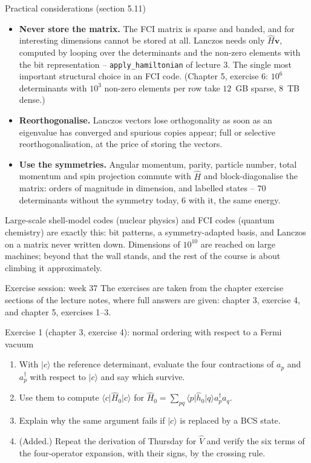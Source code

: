 \documentclass[aspectratio=169,10pt]{beamer}
\newcommand{\mbbox}[1]{%
  \begin{tcolorbox}[colback=paleblue,colframe=uioblue,title={\bfseries Many-body connection}]
  #1
  \end{tcolorbox}}
\newcommand{\ket}[1]{\vert #1\rangle}
\newcommand{\bra}[1]{\langle #1\vert}
\newcommand{\element}[3]{\langle #1\vert #2\vert #3\rangle}
\begin{document}
\begin{frame}{Practical considerations (section 5.11)}
  \small
  \begin{itemize}
    \item \textbf{Never store the matrix.} The FCI matrix is sparse and banded, and for interesting dimensions cannot be stored at all. Lanczos needs only $\hat{H}\bm{v}$, computed by looping over the determinants and the non-zero elements with the bit representation -- \texttt{apply\_hamiltonian} of lecture 3. The single most important structural choice in an FCI code. (Chapter 5, exercise 6: $10^6$ determinants with $10^3$ non-zero elements per row take $12$~GB sparse, $8$~TB dense.)
    \item \textbf{Reorthogonalise.} Lanczos vectors lose orthogonality as soon as an eigenvalue has converged and spurious copies appear; full or selective reorthogonalisation, at the price of storing the vectors.
    \item \textbf{Use the symmetries.} Angular momentum, parity, particle number, total momentum and spin projection commute with $\hat{H}$ and block-diagonalise the matrix: orders of magnitude in dimension, and labelled states -- $70$ determinants without the symmetry today, $6$ with it, the same energy.
  \end{itemize}
  \mbbox{\small Large-scale shell-model codes (nuclear physics) and FCI codes (quantum chemistry) are exactly this: bit patterns, a symmetry-adapted basis, and Lanczos on a matrix never written down. Dimensions of $10^{10}$ are reached on large machines; beyond that the wall stands, and the rest of the course is about climbing it approximately.}
\end{frame}

\begin{frame}{Exercise session: week 37}
  \footnotesize
  The exercises are taken from the chapter exercise sections of the lecture notes, where full answers are given: chapter 3, exercise 4, and chapter 5, exercises 1--3.
  \begin{block}{Exercise 1 (chapter 3, exercise 4): normal ordering with respect to a Fermi vacuum}
    \begin{enumerate}
      \item[a)] With $\ket{c}$ the reference determinant, evaluate the four contractions of $a_p$ and $a_p^{\dagger}$ with respect to $\ket{c}$ and say which survive.
      \item[b)] Use them to compute $\bra{c}\hat{H}_0\ket{c}$ for $\hat{H}_0=\sum_{pq}\element{p}{\hat{h}_0}{q}a_p^{\dagger}a_q$.
      \item[c)] Explain why the same argument fails if $\ket{c}$ is replaced by a BCS state.
      \item[d)] (Added.) Repeat the derivation of Thursday for $\hat{V}$ and verify the six terms of the four-operator expansion, with their signs, by the crossing rule.
    \end{enumerate}
  \end{block}
\end{frame}
\end{document}

